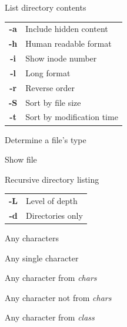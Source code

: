 \documentclass[12pt, a4paper]
{article}
\begin{document}
\begin{multicols}{3}
\begin{description}[nolistsep]
	\item[ls] List directory contents
	\item
	\begin{tabular}{cl}
		{\large \ttfamily \textbf{-a}} & Include hidden content \\
		{\large \ttfamily \textbf{-h}} & Human readable format\\
		{\large \ttfamily \textbf{-i}} & Show inode number\\
		{\large \ttfamily \textbf{-l}} & Long format \\
		{\large \ttfamily \textbf{-r}} & Reverse order \\
		{\large \ttfamily \textbf{-S}} & Sort by file size \\
		{\large \ttfamily \textbf{-t}} & Sort by modification time\\
	\end{tabular}
	\item[file] Determine a file's type
	\item[less] Show file
	\item[tree] Recursive  directory listing
	\item
	\begin{tabular}{cl}
		{\large \ttfamily \textbf{-L}} & Level of depth \\
		{\large \ttfamily \textbf{-d}} & Directories only\\
	\end{tabular}
\end{description}



\begin{description}[nolistsep]
	\item[*] Any characters
	\item[?] Any single character
	\item[{[\large \textit{chars}}{\Large]}] Any character from \textit{chars}
	\item[{[\large!\textit{chars}}{\Large]}] Any character not from \textit{chars}
	\item[{[\large:\textit{class}:}{\Large]}] Any character from \textit{class}
\end{description}



\end{multicols}
\end{document}
